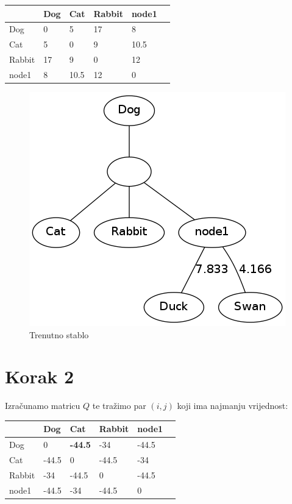 \documentclass[times, utf8, seminar, numeric]{fer}
\begin{document}
\begin{table}[h]
	\centering
    \begin{tabular}{|l|l|l|l|l|l|}
    \hline
	~ & Dog  & Cat    & Rabbit  & node1 \\ \hline
    Dog     & 0  & 5    & 17 & 8     \\ \hline
    Cat   & 5  & 0    & 9  & 10.5  \\ \hline
    Rabbit     & 17 & 9    & 0  & 12    \\ \hline
    node1 & 8  & 10.5 & 12 & 0     \\ \hline
    \end{tabular}
\end{table}

\begin{figure}[htb]
\centering
\includegraphics[scale=0.6]{./img/prvi.png}
\caption{Trenutno stablo}
\end{figure}

\newpage
\section{Korak 2}
Izračunamo matricu $Q$ te tražimo par $(i,j)$ koji ima najmanju vrijednost:

\begin{table}[h]
	\centering
    \begin{tabular}{|l|l|l|l|l|l|}
    \hline
~     & Dog     & Cat     & Rabbit     & node1 \\ \hline
    Dog     & 0     & \textbf{-44.5} & -34   & -44.5 \\ \hline
    Cat     & -44.5 & 0     & -44.5 & -34   \\ \hline
    Rabbit     & -34   & -44.5 & 0     & -44.5 \\ \hline
    node1 & -44.5 & -34   & -44.5 & 0     \\ \hline
    \end{tabular}
\end{table}
\end{document}
